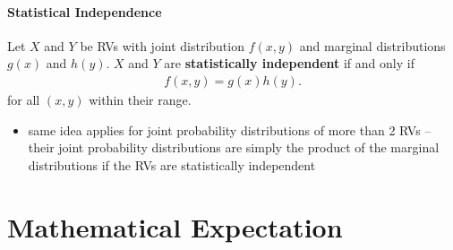 \documentclass[10pt]{article}
\begin{document}
\subsection{Statistical Independence}
\begin{definition}
    Let $X$ and $Y$ be RVs with joint distribution $f(x,y)$ and marginal distributions $g(x)$ and $h(y)$. $X$ and $Y$ are \textbf{statistically independent} if and only if
    \begin{align*}
        f(x,y) = g(x)h(y)
    .\end{align*}
    for all $(x,y)$ within their range.
\end{definition}
\begin{itemize}
    \item same idea applies for joint probability distributions of more than 2 RVs -- their joint probability distributions are simply the product of the marginal distributions if the RVs are statistically independent
\end{itemize}



\part{Mathematical Expectation}
\end{document}
